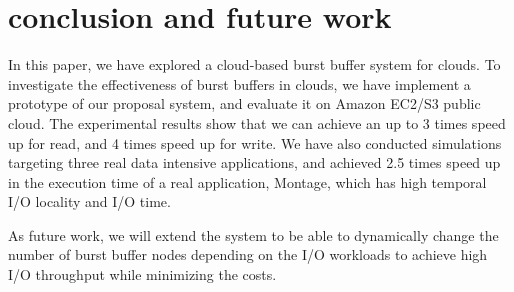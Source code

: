 \section{conclusion and future work}
\label{sec:conclusion}
In this paper, we have explored a cloud-based burst buffer system for clouds.
To investigate the effectiveness of burst buffers in clouds,
we have implement a prototype of our proposal system, and evaluate it on Amazon
EC2/S3 public cloud.
The experimental results show that we can achieve an up to 3 times speed up for
read, and 4 times speed up for write.
We have also conducted simulations targeting three real data
intensive applications, and achieved 2.5 times speed up in the execution time
of a real application, Montage, which has high temporal I/O locality and I/O
time.

As future work, we will extend the system to be able to dynamically change the
number of burst buffer nodes depending on the I/O workloads to achieve high I/O
throughput while minimizing the costs.


